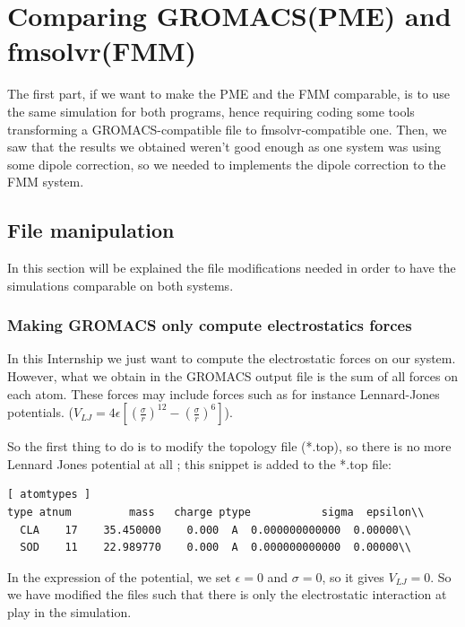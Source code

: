 \documentclass[11pt,twoside,a4paper]{report}
\begin{document}
\section{Comparing GROMACS(PME) and fmsolvr(FMM) }	

The first part, if we want to make the PME and the FMM comparable, is to use the same simulation for both programs, hence requiring coding some tools transforming a GROMACS-compatible file to fmsolvr-compatible one. Then, we saw that the results we obtained weren't good enough as one system was using some dipole correction, so we needed to implements the dipole correction to the FMM system.

\subsection{File manipulation}

In this section will be explained the file modifications needed in order to have the simulations comparable on both systems.

\subsubsection{Making GROMACS only compute electrostatics forces}

In this Internship we just want to compute the electrostatic forces on our system. However, what we obtain in the GROMACS output file is the sum of all forces on each atom. These forces may include forces such as for instance Lennard-Jones potentials.
($V_{LJ} = 4\epsilon [(\frac{\sigma}{r})^12 - (\frac{\sigma}{r})^6] $). 

So the first thing to do is to modify the topology file (*.top), so there is no more Lennard Jones potential at all ; this snippet is added to the *.top file:


\begin{verbatim}
[ atomtypes ]
type atnum         mass   charge ptype           sigma  epsilon\\
  CLA    17    35.450000    0.000  A  0.000000000000  0.00000\\
  SOD    11    22.989770    0.000  A  0.000000000000  0.00000\\

\end{verbatim}


In the expression of the potential, we set $\epsilon = 0$ and $\sigma = 0$, so it gives $V_{LJ} = 0$. So we have modified the files such that there is only the electrostatic interaction at play in the simulation.
\end{document}
